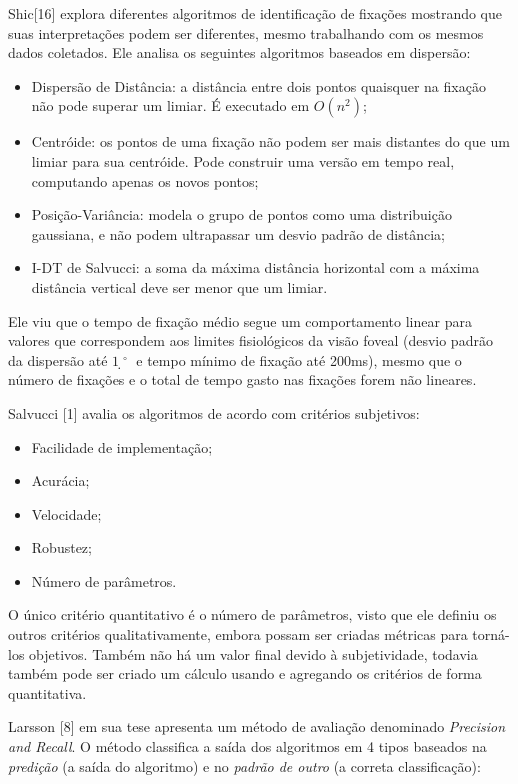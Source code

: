 \documentclass[brazil,]{report}
\begin{document}
Shic{[}16{]} explora diferentes algoritmos de identificação de fixações
mostrando que suas interpretações podem ser diferentes, mesmo
trabalhando com os mesmos dados coletados. Ele analisa os seguintes
algoritmos baseados em dispersão:

\begin{itemize}
\itemsep1pt\parskip0pt
\item
  Dispersão de Distância: a distância entre dois pontos quaisquer na
  fixação não pode superar um limiar. É executado em $O(n^2)$;
\item
  Centróide: os pontos de uma fixação não podem ser mais distantes do
  que um limiar para sua centróide. Pode construir uma versão em tempo
  real, computando apenas os novos pontos;
\item
  Posição-Variância: modela o grupo de pontos como uma distribuição
  gaussiana, e não podem ultrapassar um desvio padrão de distância;
\item
  \gls{I-DT} de Salvucci: a soma da máxima distância horizontal com a
  máxima distância vertical deve ser menor que um limiar.
\end{itemize}

Ele viu que o tempo de fixação médio segue um comportamento linear para
valores que correspondem aos limites fisiológicos da visão foveal
(desvio padrão da dispersão até $1̣^\circ$ e tempo mínimo de fixação até
200ms), mesmo que o número de fixações e o total de tempo gasto nas
fixações forem não lineares.

Salvucci {[}1{]} avalia os algoritmos de acordo com critérios
subjetivos:

\begin{itemize}
\itemsep1pt\parskip0pt
\item
  Facilidade de implementação;
\item
  Acurácia;
\item
  Velocidade;
\item
  Robustez;
\item
  Número de parâmetros.
\end{itemize}

O único critério quantitativo é o número de parâmetros, visto que ele
definiu os outros critérios qualitativamente, embora possam ser criadas
métricas para torná-los objetivos. Também não há um valor final devido à
subjetividade, todavia também pode ser criado um cálculo usando e
agregando os critérios de forma quantitativa.

Larsson {[}8{]} em sua tese apresenta um método de avaliação denominado
\emph{Precision and Recall}. O método classifica a saída dos algoritmos
em 4 tipos baseados na \emph{predição} (a saída do algoritmo) e no
\emph{padrão de outro} (a correta classificação):
\end{document}
